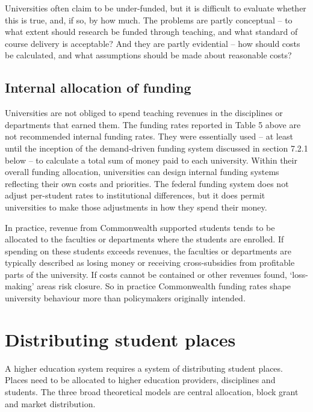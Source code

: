\documentclass[]{book}
\begin{document}
Universities often claim to be under-funded, but it is difficult to evaluate whether this is true, and, if so, by how much. The problems are partly conceptual -- to what extent should research be funded through teaching, and what standard of course delivery is acceptable? And they are partly evidential -- how should costs be calculated, and what assumptions should be made about reasonable costs?

\hypertarget{internal-allocation-of-funding}{%
\subsection{Internal allocation of funding}\label{internal-allocation-of-funding}}

Universities are not obliged to spend teaching revenues in the disciplines or departments that earned them. The funding rates reported in Table 5 above are not recommended internal funding rates. They were essentially used -- at least until the inception of the demand-driven funding system discussed in section 7.2.1 below -- to calculate a total sum of money paid to each university. Within their overall funding allocation, universities can design internal funding systems reflecting their own costs and priorities. The federal funding system does not adjust per-student rates to institutional differences, but it does permit universities to make those adjustments in how they spend their money.

In practice, revenue from Commonwealth supported students tends to be allocated to the faculties or departments where the students are enrolled. If spending on these students exceeds revenues, the faculties or departments are typically described as losing money or receiving cross-subsidies from profitable parts of the university. If costs cannot be contained or other revenues found, `loss-making' areas risk closure. So in practice Commonwealth funding rates shape university behaviour more than policymakers originally intended.

\hypertarget{distributing-student-places}{%
\section{Distributing student places}\label{distributing-student-places}}

A higher education system requires a system of distributing student places. Places need to be allocated to higher education providers, disciplines and students. The three broad theoretical models are central allocation, block grant and market distribution.
\end{document}
